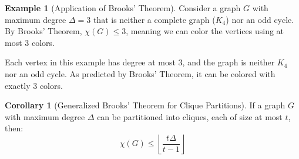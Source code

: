 \documentclass{article}
\theoremstyle{definition}
\newtheorem{example}{Example}
\newtheorem{corollary}{Corollary}
\begin{document}
\begin{example}[Application of Brooks' Theorem]
Consider a graph $G$ with maximum degree $\Delta = 3$ that is neither a complete graph ($K_4$) nor an odd cycle. By Brooks' Theorem, $\chi(G) \leq 3$, meaning we can color the vertices using at most 3 colors.

\begin{center}
\end{center}

Each vertex in this example has degree at most 3, and the graph is neither $K_4$ nor an odd cycle. As predicted by Brooks' Theorem, it can be colored with exactly 3 colors.
\end{example}

\begin{corollary}[Generalized Brooks' Theorem for Clique Partitions]
If a graph $G$ with maximum degree $\Delta$ can be partitioned into cliques, each of size at most $t$, then:
\begin{equation}
\chi(G) \leq \left\lfloor\frac{t\Delta}{t-1}\right\rfloor
\end{equation}
\end{corollary}
\end{document}
